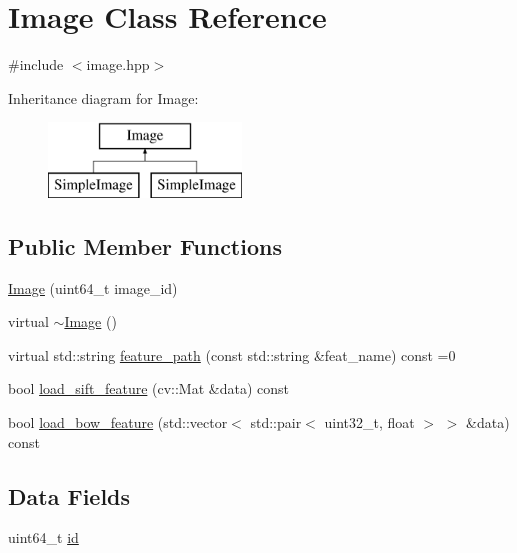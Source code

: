 \hypertarget{classImage}{\section{Image Class Reference}
\label{classImage}
}


{\ttfamily \#include $<$image.\-hpp$>$}

Inheritance diagram for Image\-:\begin{figure}[H]
\begin{center}
\leavevmode
\includegraphics[height=2.000000cm]{classImage}
\end{center}
\end{figure}
\subsection*{Public Member Functions}
\begin{DoxyCompactItemize}
\item 
\hyperlink{classImage_aa0430ef96457eafaf585ff54abc8194f}{Image} (uint64\-\_\-t image\-\_\-id)
\item 
virtual \hyperlink{classImage_a0294f63700543e11c0f0da85601c7ae5}{$\sim$\-Image} ()
\item 
virtual std\-::string \hyperlink{classImage_aa4903872aaca70ea52f2a219602d6ff2}{feature\-\_\-path} (const std\-::string \&feat\-\_\-name) const =0
\item 
bool \hyperlink{classImage_af2327d89ff13d9c3cad761723883c86e}{load\-\_\-sift\-\_\-feature} (cv\-::\-Mat \&data) const 
\item 
bool \hyperlink{classImage_a95009cbf9f7724f514d0220207a9e126}{load\-\_\-bow\-\_\-feature} (std\-::vector$<$ std\-::pair$<$ uint32\-\_\-t, float $>$ $>$ \&data) const 
\end{DoxyCompactItemize}
\subsection*{Data Fields}
\begin{DoxyCompactItemize}
\item 
uint64\-\_\-t \hyperlink{classImage_a9800c46cdd3a9b037eee627a9c0a8259}{id}
\end{DoxyCompactItemize}


